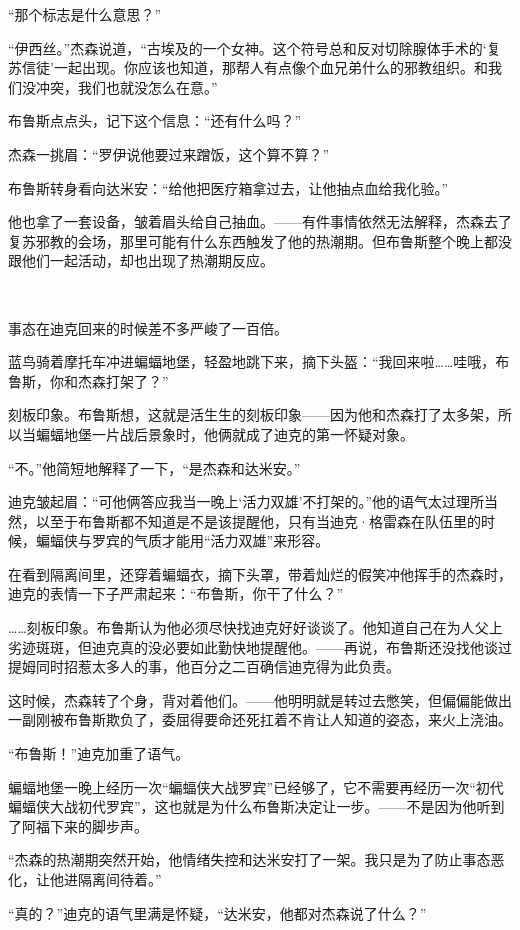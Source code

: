 \documentclass[../main]{subfiles}
\begin{document}
“那个标志是什么意思？”

“伊西丝。”杰森说道，“古埃及的一个女神。这个符号总和反对切除腺体手术的‘复苏信徒’一起出现。你应该也知道，那帮人有点像个血兄弟什么的邪教组织。和我们没冲突，我们也就没怎么在意。”

布鲁斯点点头，记下这个信息：“还有什么吗？”

杰森一挑眉：“罗伊说他要过来蹭饭，这个算不算？”

布鲁斯转身看向达米安：“给他把医疗箱拿过去，让他抽点血给我化验。”

他也拿了一套设备，皱着眉头给自己抽血。——有件事情依然无法解释，杰森去了复苏邪教的会场，那里可能有什么东西触发了他的热潮期。但布鲁斯整个晚上都没跟他们一起活动，却也出现了热潮期反应。

~\

事态在迪克回来的时候差不多严峻了一百倍。

蓝鸟骑着摩托车冲进蝙蝠地堡，轻盈地跳下来，摘下头盔：“我回来啦……哇哦，布鲁斯，你和杰森打架了？”

刻板印象。布鲁斯想，这就是活生生的刻板印象——因为他和杰森打了太多架，所以当蝙蝠地堡一片战后景象时，他俩就成了迪克的第一怀疑对象。

“不。”他简短地解释了一下，“是杰森和达米安。”

迪克皱起眉：“可他俩答应我当一晚上‘活力双雄’不打架的。”他的语气太过理所当然，以至于布鲁斯都不知道是不是该提醒他，只有当迪克·格雷森在队伍里的时候，蝙蝠侠与罗宾的气质才能用“活力双雄”来形容。

在看到隔离间里，还穿着蝙蝠衣，摘下头罩，带着灿烂的假笑冲他挥手的杰森时，迪克的表情一下子严肃起来：“布鲁斯，你干了什么？”

……刻板印象。布鲁斯认为他必须尽快找迪克好好谈谈了。他知道自己在为人父上劣迹斑斑，但迪克真的没必要如此勤快地提醒他。——再说，布鲁斯还没找他谈过提姆同时招惹太多人的事，他百分之二百确信迪克得为此负责。

这时候，杰森转了个身，背对着他们。——他明明就是转过去憋笑，但偏偏能做出一副刚被布鲁斯欺负了，委屈得要命还死扛着不肯让人知道的姿态，来火上浇油。

“布鲁斯！”迪克加重了语气。

蝙蝠地堡一晚上经历一次“蝙蝠侠大战罗宾”已经够了，它不需要再经历一次“初代蝙蝠侠大战初代罗宾”，这也就是为什么布鲁斯决定让一步。——不是因为他听到了阿福下来的脚步声。

“杰森的热潮期突然开始，他情绪失控和达米安打了一架。我只是为了防止事态恶化，让他进隔离间待着。”

“真的？”迪克的语气里满是怀疑，“达米安，他都对杰森说了什么？”
\end{document}

